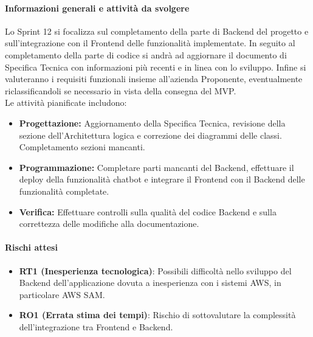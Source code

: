 \documentclass[a4paper,12pt]{article}
\begin{document}
\paragraph{Informazioni generali e attività da svolgere}
Lo Sprint 12 si focalizza sul completamento della parte di Backend del progetto e sull'integrazione con il Frontend delle funzionalità implementate. In seguito al completamento della parte di codice si andrà ad aggiornare il documento di Specifica Tecnica con informazioni più recenti e in linea con lo sviluppo. Infine si valuteranno i requisiti funzionali insieme all'azienda Proponente, eventualmente riclassificandoli se necessario in vista della consegna del MVP.\\ 
Le attività pianificate includono:
\begin{itemize}
    \item \textbf{Progettazione:} Aggiornamento della Specifica Tecnica, revisione della sezione dell'Architettura logica e correzione dei diagrammi delle classi. Completamento sezioni mancanti.
    \item \textbf{Programmazione:} Completare parti mancanti del Backend, effettuare il deploy della funzionalità chatbot e integrare il Frontend con il Backend delle funzionalità completate.
    \item \textbf{Verifica:} Effettuare controlli sulla qualità del codice Backend e sulla correttezza delle modifiche alla documentazione.
\end{itemize}

\paragraph{Rischi attesi}
\begin{itemize}
    \item \textbf{RT1 (Inesperienza tecnologica)}: Possibili difficoltà nello sviluppo del Backend dell'applicazione dovuta a inesperienza con i sistemi AWS, in particolare AWS SAM.
    \item \textbf{RO1 (Errata stima dei tempi)}: Rischio di sottovalutare la complessità dell'integrazione tra Frontend e Backend.
\end{itemize}
\end{document}
